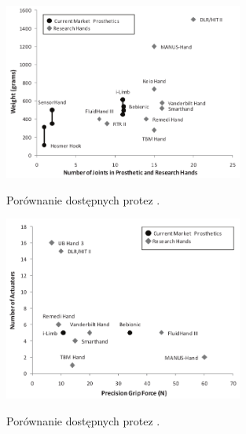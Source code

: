 \documentclass[8pt]{beamer}
\begin{document}
\begin{frame}%
	\begin{center}
		\begin{figure}
			\includegraphics[width=0.7\textwidth]{graphics/weight_joints.png}
			\label{graph:hand}	
			\caption{Porównanie dostępnych protez \cite{belter2011performance}.}
		\end{figure}
	\end{center}

\end{frame}

\begin{frame}%
	\begin{center}
		\begin{figure}
			\includegraphics[width=0.7\textwidth]{graphics/actuators_gripforce.png}
			\label{graph:hand}	
			\caption{Porównanie dostępnych protez \cite{belter2011performance}.}
		\end{figure}
	\end{center}

\end{frame}
\end{document}
